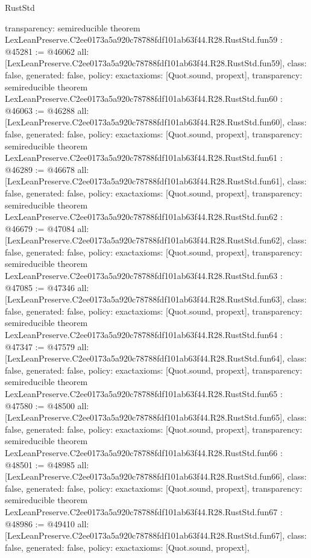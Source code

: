 \begin{lexlean}{RustStd}
\begin{coremodule}
{  transparency: semireducible
}
theorem LexLeanPreserve.C2ee0173a5a920c78788fdf101ab63f44.R28.RustStd.fun59 : @45281 := @46062 {
  all: [LexLeanPreserve.C2ee0173a5a920c78788fdf101ab63f44.R28.RustStd.fun59],
  class: false,
  generated: false,
  policy: exact{axioms: [Quot.sound, propext]},
  transparency: semireducible
}
theorem LexLeanPreserve.C2ee0173a5a920c78788fdf101ab63f44.R28.RustStd.fun60 : @46063 := @46288 {
  all: [LexLeanPreserve.C2ee0173a5a920c78788fdf101ab63f44.R28.RustStd.fun60],
  class: false,
  generated: false,
  policy: exact{axioms: [Quot.sound, propext]},
  transparency: semireducible
}
theorem LexLeanPreserve.C2ee0173a5a920c78788fdf101ab63f44.R28.RustStd.fun61 : @46289 := @46678 {
  all: [LexLeanPreserve.C2ee0173a5a920c78788fdf101ab63f44.R28.RustStd.fun61],
  class: false,
  generated: false,
  policy: exact{axioms: [Quot.sound, propext]},
  transparency: semireducible
}
theorem LexLeanPreserve.C2ee0173a5a920c78788fdf101ab63f44.R28.RustStd.fun62 : @46679 := @47084 {
  all: [LexLeanPreserve.C2ee0173a5a920c78788fdf101ab63f44.R28.RustStd.fun62],
  class: false,
  generated: false,
  policy: exact{axioms: [Quot.sound, propext]},
  transparency: semireducible
}
theorem LexLeanPreserve.C2ee0173a5a920c78788fdf101ab63f44.R28.RustStd.fun63 : @47085 := @47346 {
  all: [LexLeanPreserve.C2ee0173a5a920c78788fdf101ab63f44.R28.RustStd.fun63],
  class: false,
  generated: false,
  policy: exact{axioms: [Quot.sound, propext]},
  transparency: semireducible
}
theorem LexLeanPreserve.C2ee0173a5a920c78788fdf101ab63f44.R28.RustStd.fun64 : @47347 := @47579 {
  all: [LexLeanPreserve.C2ee0173a5a920c78788fdf101ab63f44.R28.RustStd.fun64],
  class: false,
  generated: false,
  policy: exact{axioms: [Quot.sound, propext]},
  transparency: semireducible
}
theorem LexLeanPreserve.C2ee0173a5a920c78788fdf101ab63f44.R28.RustStd.fun65 : @47580 := @48500 {
  all: [LexLeanPreserve.C2ee0173a5a920c78788fdf101ab63f44.R28.RustStd.fun65],
  class: false,
  generated: false,
  policy: exact{axioms: [Quot.sound, propext]},
  transparency: semireducible
}
theorem LexLeanPreserve.C2ee0173a5a920c78788fdf101ab63f44.R28.RustStd.fun66 : @48501 := @48985 {
  all: [LexLeanPreserve.C2ee0173a5a920c78788fdf101ab63f44.R28.RustStd.fun66],
  class: false,
  generated: false,
  policy: exact{axioms: [Quot.sound, propext]},
  transparency: semireducible
}
theorem LexLeanPreserve.C2ee0173a5a920c78788fdf101ab63f44.R28.RustStd.fun67 : @48986 := @49410 {
  all: [LexLeanPreserve.C2ee0173a5a920c78788fdf101ab63f44.R28.RustStd.fun67],
  class: false,
  generated: false,
  policy: exact{axioms: [Quot.sound, propext]},
}
\end{coremodule}
\end{lexlean}
